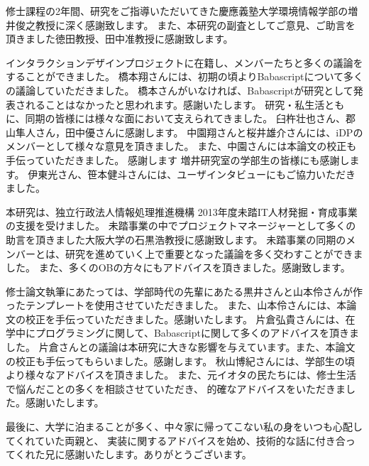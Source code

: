 \begin{acknowledgment}

修士課程の2年間、研究をご指導いただいてきた慶應義塾大学環境情報学部の増井俊之教授に深く感謝致します。
また、本研究の副査としてご意見、ご助言を頂きました徳田教授、田中准教授に感謝致します。

インタラクションデザインプロジェクトに在籍し、メンバーたちと多くの議論をすることができました。
橋本翔さんには、初期の頃よりBabascriptについて多くの議論していただきました。
橋本さんがいなければ、Babascriptが研究として発表されることはなかったと思われます。感謝いたします。
研究・私生活ともに、同期の皆様には様々な面において支えられてきました。
臼杵壮也さん、郡山隼人さん，田中優さんに感謝します。
中園翔さんと桜井雄介さんには、iDPのメンバーとして様々な意見を頂きました。
また、中園さんには本論文の校正も手伝っていただきました。
感謝します
増井研究室の学部生の皆様にも感謝します。
伊東光さん、笹本健斗さんには、ユーザインタビューにもご協力いただきました。

本研究は、独立行政法人情報処理推進機構 2013年度未踏IT人材発掘・育成事業の支援を受けました。
未踏事業の中でプロジェクトマネージャーとして多くの助言を頂きました大阪大学の石黒浩教授に感謝致します。
未踏事業の同期のメンバーとは、研究を進めていく上で重要となった議論を多く交わすことができました。
また、多くのOBの方々にもアドバイスを頂きました。感謝致します。

修士論文執筆にあたっては、学部時代の先輩にあたる黒井さんと山本伶さんが作ったテンプレートを使用させていただきました。
また、山本伶さんには、本論文の校正を手伝っていただきました。感謝いたします。
片倉弘貴さんには、在学中にプログラミングに関して、Babascriptに関して多くのアドバイスを頂きました。
片倉さんとの議論は本研究に大きな影響を与えています。また、本論文の校正も手伝ってもらいました。感謝します。
秋山博紀さんには、学部生の頃より様々なアドバイスを頂きました。
また、元イオタの民たちには、修士生活で悩んだことの多くを相談させていただき、
的確なアドバイスをいただきました。感謝いたします。

最後に、大学に泊まることが多く、中々家に帰ってこない私の身をいつも心配してくれていた両親と、
実装に関するアドバイスを始め、技術的な話に付き合ってくれた兄に感謝いたします。ありがとうございます。

\end{acknowledgment}
